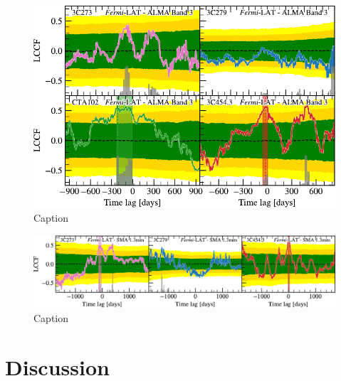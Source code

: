\documentclass[twocolumn]{aastex62}
\begin{document}
\begin{figure}
    \centering
    \includegraphics[width = .99\linewidth]{figures/lccf__nsim5000_fermi_EM13gaps-data_alma-band3_MM14gaps-none_lccf.pdf}
    \caption{Caption}
    \label{fig:lccf-alma}
\end{figure}

\begin{figure}
    \centering
    \includegraphics[width = .9\linewidth]{figures/lccf__nsim5000_fermi_EM13gaps-data_sma-1p3mm_MM14gaps-none_lccf.pdf}
    \caption{Caption}
    \label{fig:lccf-sma}
\end{figure}

\section{Discussion}
\end{document}
